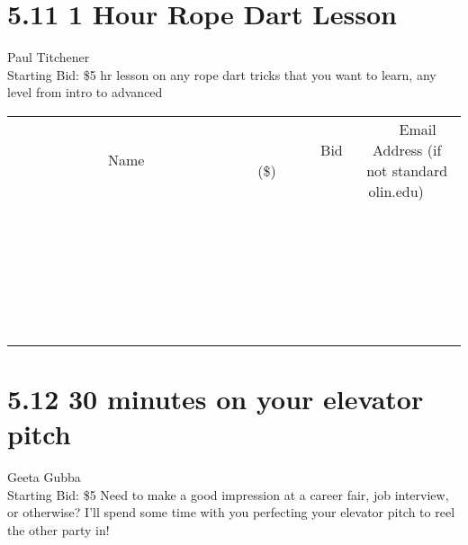 \documentclass[11pt]{article}
\begin{document}
\section*{5.11 1 Hour Rope Dart Lesson}
Paul Titchener
\\
Starting Bid: \$5
 hr lesson on any rope dart tricks that you want to learn, any level from intro to advanced
\\[6ex]
\begin{tabular}{c c c}
~~~~~~~~~~~~~Name~~~~~~~~~~~~~ & ~~~~~~~~~Bid (\$)~~~~~~~~~  & ~~~Email Address (if not standard olin.edu)~~~\\
 & & \\
\hline
 & & \\
\hline
 & & \\
\hline
 & & \\
\hline
 & & \\
\hline
 & & \\
\hline
 & & \\
\hline
 & & \\
\hline
 & & \\
\hline
 & & \\
\hline
 & & \\
\hline
 & & \\
\hline
 & & \\
\hline
 & & \\
\hline
 & & \\
\hline
 & & \\
\hline
 & & \\
\hline
 & & \\
\hline
 & & \\
\hline
 & & \\
\hline
 & & \\
\hline
 & & \\
\hline
 & & \\
\hline
 & & \\
\hline
 & & \\
\hline
 & & \\
\hline
\end{tabular}
\newpage
\section*{5.12 30 minutes on your elevator pitch}
Geeta Gubba
\\
Starting Bid: \$5
\newline
Need to make a good impression at a career fair, job interview, or otherwise? I'll spend some time with you perfecting your elevator pitch to reel the other party in!
\end{document}
